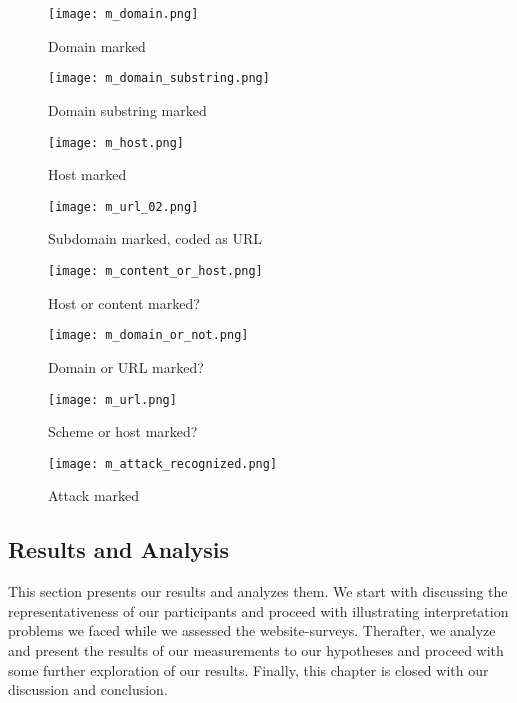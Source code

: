 \begin{figure}
\centering
\texttt{[image: m\_domain.png]}
\caption{Domain marked}
\label{fig:m_domain}
\end{figure}


\begin{figure}
\centering
\texttt{[image: m\_domain\_substring.png]}
\caption{Domain substring marked}
\label{fig:m_domain_substring}
\end{figure}

\begin{figure}
\centering
\texttt{[image: m\_host.png]}
\caption{Host marked}
\label{fig:m_host}
\end{figure}

\begin{figure}
\centering
\texttt{[image: m\_url\_02.png]}
\caption{Subdomain marked, coded as URL}
\label{fig:m_url_02}
\end{figure}

\begin{figure}
\centering
\texttt{[image: m\_content\_or\_host.png]}
\caption{Host or content marked?}
\label{fig:m_content_or_host}
\end{figure}

\begin{figure}
\centering
\texttt{[image: m\_domain\_or\_not.png]}
\caption{Domain or URL marked?}
\label{fig:m_domain_or_not}
\end{figure}

\begin{figure}
\centering
\texttt{[image: m\_url.png]}
\caption{Scheme or host marked?}
\label{fig:m_url}
\end{figure}

\begin{figure}
\centering
\texttt{[image: m\_attack\_recognized.png]}
\caption{Attack marked}
\label{fig:m_attack_recognized}
\end{figure}



\subsection{Results and Analysis}
This section presents our results and analyzes them. 
We start with discussing the representativeness of our participants and proceed with illustrating interpretation problems we faced while we assessed the website-surveys.
Therafter, we analyze and present the results of our measurements to our hypotheses and proceed with some further exploration of our results.
Finally, this chapter is closed with our discussion and conclusion.



